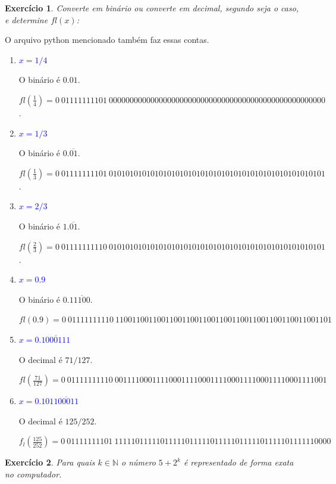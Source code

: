 \documentclass[a4paper,12pt]{article}
\theoremstyle{exer}
\newtheorem{exercise}{Exercício}
\theoremstyle{definition}
\newcommand{\enu}[1]{\textcolor{blue}{#1}}
\begin{document}
\begin{exercise}
    Converte em binário ou converte em decimal, segundo seja o caso, e
    determine $fl(x)$: 
\end{exercise}

O arquivo python mencionado também faz essas contas. 

\begin{enumerate}
    \item \enu{$x = 1/4$} 
    
    O binário é $0.01$.

    $fl\left(\frac{1}{4}\right) =  0~01111111101~0000000000000000000000000000000000000000000000000000$.

    \item \enu{$x = 1/3$}
    
    O binário é $0.\overline{01}$.

    $fl\left(\frac{1}{3}\right) = 0~01111111101~ 0101010101010101010101010101010101010101010101010101$.

    \item \enu{$x = 2/3$}
    
    O binário é $1.\overline{01}$.

    $fl\left(\frac{2}{3}\right) = 0~01111111110~ 0101010101010101010101010101010101010101010101010101$.

    \item \enu{$x = 0.9$}
    
    O binário é $0.1\overline{1100}$.

    $fl(0.9) = 0~01111111110~1100110011001100110011001100110011001100110011001101$

    \item \enu{$x = 0.\overline{1000111}$}
    
    O decimal é $71/127$.

    $fl\left(\frac{71}{127}\right) =
    0~01111111110~001111000111100011110001111000111100011110001111001$

    \item \enu{$x = 0.101\overline{100011}$}
    
    O decimal é $125/252$.

    $f_l\left(\frac{125}{252}\right) = 0~01111111101~1111101111101111101111101111101111101111101111110000$

\end{enumerate}

\begin{exercise}
    Para quais $k\in\mathbb{N}$ o número $5 + 2^k$ é representado de forma
    exata no computador. 
\end{exercise}
\end{document}
